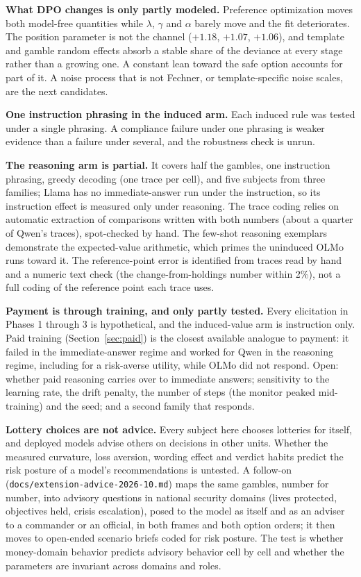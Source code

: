 \documentclass[11pt]{article}
\begin{document}
\textbf{What DPO changes is only partly modeled.} Preference optimization moves both model-free
quantities while $\lambda$, $\gamma$ and $\alpha$ barely move and the fit deteriorates. The position
parameter is not the channel ($+1.18$, $+1.07$, $+1.06$), and template and gamble random effects absorb
a stable share of the deviance at every stage rather than a growing one. A constant lean toward the
safe option accounts for part of it. A noise process that is not Fechner, or template-specific noise
scales, are the next candidates.

\textbf{One instruction phrasing in the induced arm.} Each induced rule was tested under a single
phrasing. A compliance failure under one phrasing is weaker evidence than a failure under several, and
the robustness check is unrun.

\textbf{The reasoning arm is partial.} It covers half the gambles, one instruction phrasing, greedy
decoding (one trace per cell), and five subjects from three families; Llama has no immediate-answer run
under the instruction, so its instruction effect is measured only under reasoning.
The trace coding relies on automatic extraction of comparisons written with both numbers (about a
quarter of Qwen's traces), spot-checked by hand. The few-shot reasoning exemplars demonstrate the expected-value arithmetic, which
primes the uninduced OLMo runs toward it. The reference-point error is identified from traces read by
hand and a numeric text check (the change-from-holdings number within 2\%), not a full coding of the
reference point each trace uses.

\textbf{Payment is through training, and only partly tested.} Every elicitation in Phases 1 through 3 is
hypothetical, and the induced-value arm is instruction only. Paid training (Section~\ref{sec:paid}) is
the closest available analogue to payment: it failed in the immediate-answer regime and worked for Qwen
in the reasoning regime, including for a risk-averse utility, while OLMo did not respond. Open: whether
paid reasoning carries over to immediate answers; sensitivity to the learning rate, the drift penalty,
the number of steps (the monitor peaked mid-training) and the seed; and a second family that responds.

\textbf{Lottery choices are not advice.} Every subject here chooses lotteries for itself, and deployed
models advise others on decisions in other units. Whether the measured curvature, loss aversion,
wording effect and verdict habits predict the risk posture of a model's recommendations is untested. A
follow-on (\texttt{docs/extension-advice-2026-10.md}) maps the same gambles, number for number, into
advisory questions in national security domains (lives protected, objectives held, crisis
escalation), posed to the model as itself and as an adviser to a commander or an official, in both
frames and both option orders; it then moves to open-ended scenario briefs coded for risk posture. The
test is whether money-domain behavior predicts advisory behavior cell by cell and whether the
parameters are invariant across domains and roles.
\end{document}

